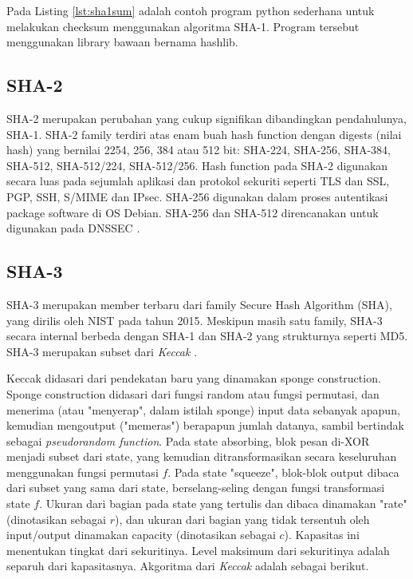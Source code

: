 

Pada Listing \ref{lst:sha1sum} adalah contoh program python sederhana untuk melakukan checksum menggunakan algoritma SHA-1. Program tersebut menggunakan library bawaan bernama hashlib.

\subsection{SHA-2}
\label{subsec:SHA2}

SHA-2 merupakan perubahan yang cukup signifikan dibandingkan pendahulunya, SHA-1. SHA-2 family terdiri atas enam buah hash function dengan digests (nilai hash) yang bernilai 2254, 256, 384 atau 512 bit: SHA-224, SHA-256, SHA-384, SHA-512, SHA-512/224, SHA-512/256. Hash function pada SHA-2 digunakan secara luas pada sejumlah aplikasi dan protokol sekuriti seperti TLS dan SSL, PGP, SSH, S/MIME dan IPsec. SHA-256 digunakan dalam proses autentikasi package software di OS Debian. SHA-256 dan SHA-512 direncanakan untuk digunakan pada DNSSEC \citep{rfc5702}.

\subsection{SHA-3}
\label{subsec:SHA3}

SHA-3 merupakan member terbaru dari family Secure Hash Algorithm (SHA), yang dirilis oleh NIST pada tahun 2015. Meskipun masih satu family, SHA-3 secara internal berbeda dengan SHA-1 dan SHA-2 yang strukturnya seperti MD5. SHA-3 merupakan subset dari \emph{Keccak} \citep{nist2012}. 

Keccak didasari dari pendekatan baru yang dinamakan sponge construction. Sponge construction didasari dari fungsi random atau fungsi permutasi, dan menerima (atau "menyerap", dalam istilah sponge) input data sebanyak apapun, kemudian mengoutput ("memeras") berapapun jumlah datanya, sambil bertindak sebagai \emph{pseudorandom function}. Pada state absorbing, blok pesan di-XOR menjadi subset dari state, yang kemudian ditransformasikan secara keseluruhan menggunakan fungsi permutasi \(f\). Pada state "squeeze", blok-blok output dibaca dari subset yang sama dari state, berselang-seling dengan fungsi transformasi state \(f\). Ukuran dari bagian pada state yang tertulis dan dibaca dinamakan "rate" (dinotasikan sebagai \(r\)), dan ukuran dari bagian yang tidak tersentuh oleh input/output dinamakan capacity (dinotasikan sebagai \(c\)). Kapasitas ini menentukan tingkat dari sekuritinya. Level maksimum dari sekuritinya adalah separuh dari kapasitasnya. Akgoritma dari \emph{Keccak} adalah sebagai berikut.


